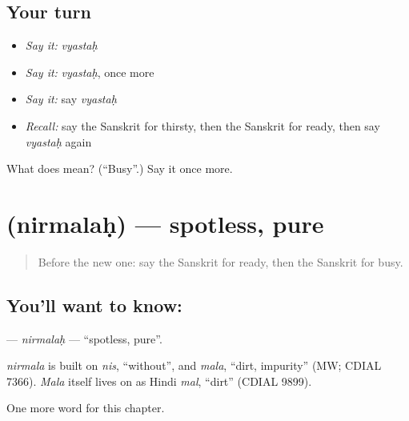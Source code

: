 \subsection*{Your turn}
\begin{itemize}
\raggedright
  \item \emph{Say it:} \emph{vyastaḥ}
  \item \emph{Say it:} \emph{vyastaḥ}, once more
  \item \emph{Say it:} say \emph{vyastaḥ}
  \item \emph{Recall:} say the Sanskrit for thirsty, then the Sanskrit for ready, then say \emph{vyastaḥ} again
\end{itemize}

\begin{tcolorbox}[breakable,colback=teal!4,colframe=teal!35!black,title={Before you move on}]
What does  mean? (\textquotedblleft{}Busy\textquotedblright{}.) Say it once more.
\end{tcolorbox}
\section[\texorpdfstring{\sk{निर्मलः} (nirmalaḥ)}{निर्मलः (nirmalaḥ)}]{ (nirmalaḥ) — spotless, pure}

\label{lesson:SA-C188-nirmalah}



\begin{quote}
Before the new one: say the Sanskrit for ready, then the Sanskrit for busy.
\end{quote}

\subsection*{You'll want to know: }
\textbf{} — \emph{nirmalaḥ} — \textquotedblleft{}spotless, pure\textquotedblright{}.

\begin{cousinweb}
\emph{nirmala} is built on \emph{nis}, \textquotedblleft{}without\textquotedblright{}, and \emph{mala}, \textquotedblleft{}dirt, impurity\textquotedblright{} (MW; CDIAL 7366). \emph{Mala} itself lives on as Hindi \emph{mal}, \textquotedblleft{}dirt\textquotedblright{} (CDIAL 9899).
\end{cousinweb}

\begin{grammarlens}[title={What you've built}]
One more word for this chapter.
\end{grammarlens}

